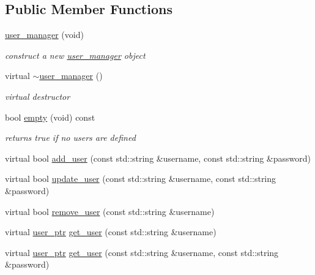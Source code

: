 \subsection*{Public Member Functions}
\begin{DoxyCompactItemize}
\item 
\hyperlink{classpion_1_1user__manager_a77ce496a03d84d4bd6e50747b53fd75d}{user\-\_\-manager} (void)
\begin{DoxyCompactList}\small\item\em construct a new \hyperlink{classpion_1_1user__manager}{user\-\_\-manager} object \end{DoxyCompactList}\item 
virtual \hyperlink{classpion_1_1user__manager_a375a8b8618977fc60491c525390f1fb6}{$\sim$user\-\_\-manager} ()
\begin{DoxyCompactList}\small\item\em virtual destructor \end{DoxyCompactList}\item 
bool \hyperlink{classpion_1_1user__manager_a88965b0300b9d137d45ae454f05b0952}{empty} (void) const 
\begin{DoxyCompactList}\small\item\em returns true if no users are defined \end{DoxyCompactList}\item 
virtual bool \hyperlink{classpion_1_1user__manager_a533373b79db2ce4c0bcd42f9fcd9ab71}{add\-\_\-user} (const std\-::string \&username, const std\-::string \&password)
\item 
virtual bool \hyperlink{classpion_1_1user__manager_a78b22f774144fa0c65c2938a85ae06e0}{update\-\_\-user} (const std\-::string \&username, const std\-::string \&password)
\item 
virtual bool \hyperlink{classpion_1_1user__manager_a5e9014c6d1a351bd5d997d1f5c3b89f0}{remove\-\_\-user} (const std\-::string \&username)
\item 
virtual \hyperlink{namespacepion_afd2ae32f926db1286ba2e83011456e11}{user\-\_\-ptr} \hyperlink{classpion_1_1user__manager_ae3ac613907d88d967edc1849a937b10e}{get\-\_\-user} (const std\-::string \&username)
\item 
virtual \hyperlink{namespacepion_afd2ae32f926db1286ba2e83011456e11}{user\-\_\-ptr} \hyperlink{classpion_1_1user__manager_a2f1534906b678b6cfe375fdd643edf39}{get\-\_\-user} (const std\-::string \&username, const std\-::string \&password)
\end{DoxyCompactItemize}
